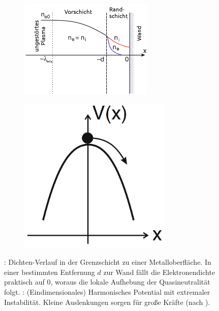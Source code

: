       \begin{figure}
        \centering
        \begin{subfigure}[b]{0.6\textwidth}
          \centering
          \includegraphics[width=0.7\textwidth,height=0.5\textwidth]{figs/randschichtpiel.png}
          \caption{}
          \label{img:dichterand}
        \end{subfigure}
        \begin{subfigure}[b]{0.375\textwidth}
          \centering
          \includegraphics[width=0.8\textwidth,height=0.8\textwidth]{figs/parabelpiel.png}
          \caption{}
          \label{img:parab}
        \end{subfigure}
        \caption{: Dichten-Verlauf in der Grenzschicht zu einer Metalloberfläche. In einer bestimmten Entfernung $d$ zur Wand fällt die Elektronendichte praktisch auf 0, woraus die lokale Aufhebung der Quasineutralität folgt. : (Eindimensionales) Harmonisches Potential mit extremaler Instabilität. Kleine Auslenkungen sorgen für große Kräfte (nach \cite{Piel10}).}
      \end{figure}

